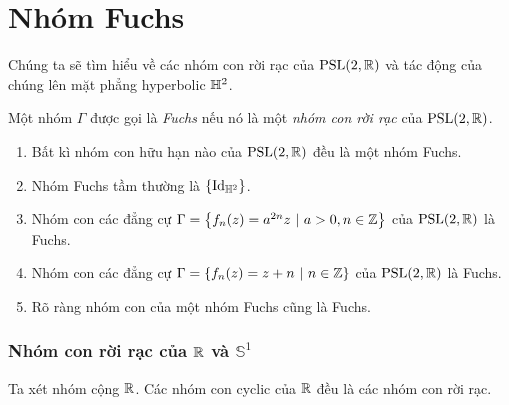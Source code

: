\section{Nhóm Fuchs}
Chúng ta sẽ tìm hiểu về các nhóm con rời rạc của $\operatorname{PSL}(2,\mathbb{R})$ và tác động của chúng lên mặt phẳng hyperbolic $\mathbb{H}^2$.
\begin{defn}
    Một nhóm $\Gamma$ được gọi là  \textit{Fuchs} nếu nó là một \textit{nhóm con rời rạc} của $\operatorname{PSL}(2,\mathbb{R})$.
\end{defn}
\begin{exam*}
    \begin{enumerate}
        \item Bất kì nhóm con hữu hạn nào của $\operatorname{PSL}(2,\mathbb{R})$ đều là một nhóm Fuchs.
        \item Nhóm Fuchs tầm thường là $\{\operatorname{Id}_{\mathbb{H}^2}\}$.
        \item Nhóm con các đẳng cự $\Gamma = \left\{f_n(z) = a^{2n}z ~|~a > 0, n \in \mathbb{Z}\right\} $ của $ \operatorname{PSL}(2,\mathbb{R})$ là Fuchs.
        \item Nhóm con các đẳng cự $\Gamma = \{f_n(z) = z+n~|~n\in \mathbb{Z}\}$ của $ \operatorname{PSL}(2,\mathbb{R})$ là Fuchs.
        \item Rõ ràng nhóm con của một nhóm Fuchs cũng là Fuchs.
    \end{enumerate}
\end{exam*}
\subsubsection{Nhóm con rời rạc của $\mathbb{R}$ và $\mathbb{S}^1$}
    Ta xét nhóm cộng $\mathbb{R}$. Các nhóm con cyclic của $\mathbb{R}$ đều là các nhóm con rời rạc. 

